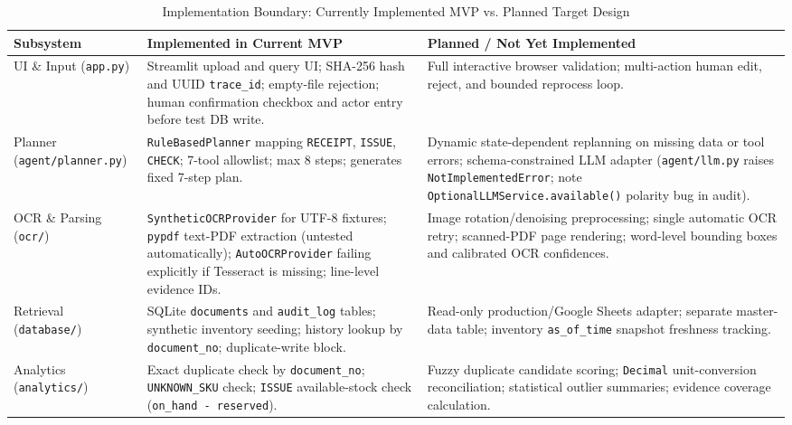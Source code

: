 \documentclass[conference]{IEEEtran}
\begin{document}
\begin{table}[t]
\caption{Implementation Boundary: Currently Implemented MVP vs. Planned Target Design}
\label{tab:impl_boundary}
\centering
\footnotesize
\setlength{\tabcolsep}{4pt}
\begin{tabular}{|>{\raggedright\arraybackslash}p{2.4cm}|>{\raggedright\arraybackslash}p{6.6cm}|>{\raggedright\arraybackslash}p{7.1cm}|}
\hline
\textbf{Subsystem} & \textbf{Implemented in Current MVP} & \textbf{Planned / Not Yet Implemented} \\
\hline
UI \& Input (\texttt{app.py}) & Streamlit upload and query UI; SHA-256 hash and UUID \texttt{trace\_\allowbreak id}; empty-file rejection; human confirmation checkbox and actor entry before test DB write. & Full interactive browser validation; multi-action human edit, reject, and bounded reprocess loop. \\
\hline
Planner (\texttt{agent/\allowbreak planner.py}) & \texttt{RuleBasedPlanner} mapping \texttt{RECEIPT}, \texttt{ISSUE}, \texttt{CHECK}; 7-tool allowlist; max 8 steps; generates fixed 7-step plan. & Dynamic state-dependent replanning on missing data or tool errors; schema-constrained LLM adapter (\texttt{agent/\allowbreak llm.py} raises \texttt{NotImplementedError}; note \texttt{OptionalLLMService.\allowbreak available()} polarity bug in audit). \\
\hline
OCR \& Parsing (\texttt{ocr/}) & \texttt{SyntheticOCRProvider} for UTF-8 fixtures; \texttt{pypdf} text-PDF extraction (untested automatically); \texttt{AutoOCRProvider} failing explicitly if Tesseract is missing; line-level evidence IDs. & Image rotation/denoising preprocessing; single automatic OCR retry; scanned-PDF page rendering; word-level bounding boxes and calibrated OCR confidences. \\
\hline
Retrieval (\texttt{database/}) & SQLite \texttt{documents} and \texttt{audit\_\allowbreak log} tables; synthetic inventory seeding; history lookup by \texttt{document\_\allowbreak no}; duplicate-write block. & Read-only production/Google Sheets adapter; separate master-data table; inventory \texttt{as\_\allowbreak of\_\allowbreak time} snapshot freshness tracking. \\
\hline
Analytics (\texttt{analytics/}) & Exact duplicate check by \texttt{document\_\allowbreak no}; \texttt{UNKNOWN\_\allowbreak SKU} check; \texttt{ISSUE} available-stock check (\texttt{on\_\allowbreak hand - reserved}). & Fuzzy duplicate candidate scoring; \texttt{Decimal} unit-conversion reconciliation; statistical outlier summaries; evidence coverage calculation. \\

\end{tabular}
\end{table}
\end{document}
